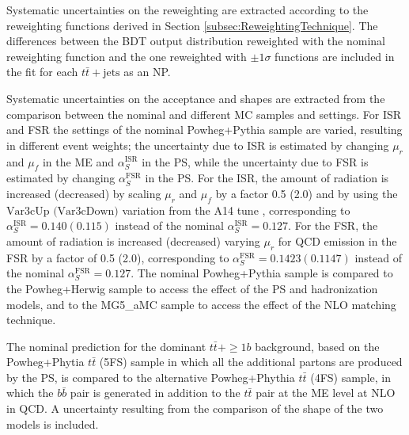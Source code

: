 \begin{description}
    Systematic uncertainties on the reweighting are extracted according to the reweighting functions derived in Section \ref{subsec:ReweightingTechnique}. The differences between the BDT output distribution reweighted with the nominal reweighting function and the one reweighted with ${\pm}1{\sigma}$ functions are included in the fit for each $t\bar{t}+\text{jets}$ as an NP.
    
    Systematic uncertainties on the acceptance and shapes are extracted from the comparison between the nominal and different MC samples and settings. For ISR and FSR the settings of the nominal Powheg+Pythia sample are varied, resulting in different event weights; the uncertainty due to ISR is estimated by changing $\mu_{r}$ and $\mu_{f}$ in the ME and $\alpha_{S}^{\text{ISR}}$ in the PS, while the uncertainty due to FSR is estimated by changing $\alpha_{S}^{\text{FSR}}$ in the PS. For the ISR, the amount of radiation is increased (decreased) by scaling $\mu_{r}$ and $\mu_{f}$ by a factor 0.5 (2.0) and by using the $\text{Var3cUp (Var3cDown)}$ variation from the A14 tune \cite{ATL-PHYS-PUB-2014-021}, corresponding to $\alpha_{S}^{\text{ISR}}=0.140(0.115)$ instead of the nominal $\alpha_{S}^{\text{ISR}}=0.127$. For the FSR, the amount of radiation is increased (decreased) varying $\mu_{r}$ for QCD emission in the FSR by a factor of 0.5 (2.0), corresponding to $\alpha_{S}^{\text{FSR}}=0.1423(0.1147)$ instead of the nominal $\alpha_{S}^{\text{FSR}}=0.127$. The nominal Powheg+Pythia sample is compared to the Powheg+Herwig sample to access the effect of the PS and hadronization models, and to the MG5\_aMC sample to access the effect of the NLO matching technique.

    The nominal prediction for the dominant $t\bar{t}+\geq1b$ background, based on the Powheg+Phytia $t\bar{t}$ (5FS) sample in which all the additional partons are produced by the PS, is compared to the alternative Powheg+Phythia $t\bar{t}$ (4FS) sample, in which the $b\bar{b}$ pair is generated in addition to the $t\bar{t}$ pair at the ME level at NLO in QCD. A uncertainty resulting from the comparison of the shape of the two models is included.


\end{description}
